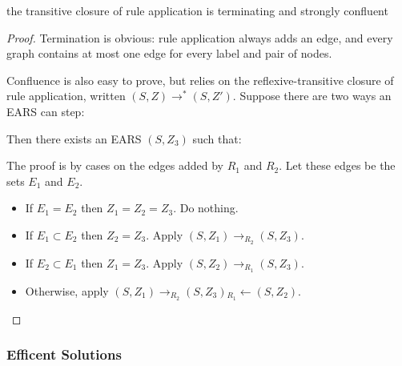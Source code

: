 \documentclass{article}
\begin{document}
\begin{theorem}
  the transitive closure of rule application is terminating and strongly confluent
\end{theorem}
\begin{proof}
Termination is obvious: rule application always adds an edge, and every graph contains at most one edge for every label and pair of nodes.

Confluence is also easy to prove, but relies on the reflexive-transitive closure of rule application, written $(S,Z) \rightarrow^* (S,Z')$.
Suppose there are two ways an EARS can step:
\begin{center}\end{center}

Then there exists an EARS $(S, Z_3)$ such that:

\begin{center}\end{center}

The proof is by cases on the edges added by $R_1$ and $R_2$.
Let these edges be the sets $E_1$ and $E_2$.
\begin{itemize}
\item If $E_1 = E_2$ then $Z_1 = Z_2 = Z_3$. Do nothing.
\item If $E_1 \subset E_2$ then $Z_2 = Z_3$. Apply $(S, Z_1) \rightarrow_{R_2} (S, Z_3)$.
\item If $E_2 \subset E_1$ then $Z_1 = Z_3$. Apply $(S, Z_2) \rightarrow_{R_1} (S, Z_3)$.
\item Otherwise, apply $(S, Z_1) \rightarrow_{R_2} (S, Z_3) {}_{R_1}\leftarrow (S, Z_2)$.
\end{itemize}
\end{proof}


\subsubsection*{Efficent Solutions}
\end{document}
